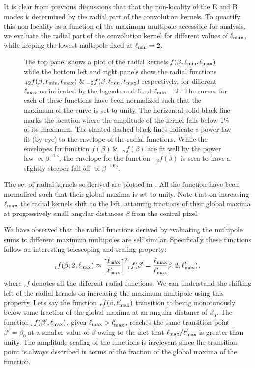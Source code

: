 It is clear from previous discussions that that the non-locality of the E and B modes is determined by the radial part of the convolution kernels. To quantify this non-locality as a function of the maximum multipole accessible for analysis, we evaluate the radial part of the convolution kernel for different values of $\ell_{\rm max}$, while keeping the lowest multipole fixed at $\ell_{\rm min}=2$. 
%
\begin{figure}[t]
\centering
{}
\caption{The top panel shows a plot of the radial kernels $f(\beta,\ell_{\rm min},\ell_{\rm max})$ while the bottom left and right panels show the radial functions ${}_{+2}f(\beta,\ell_{\rm min},\ell_{\rm max}) ~\&~ {}_{-2}f(\beta,\ell_{\rm min},\ell_{\rm max})$ respectively, for different $\ell_{\rm max}$ as indicated by the legends and fixed $\ell_{\rm min}=2$. The curves for each of these functions have been normalized such that the maximum of the curve is set to unity. The horizontal solid black line marks the location where the amplitude of the kernel falls below 1\% of its maximum. The slanted dashed black lines indicate a power law fit (by eye) to the envelope of the radial functions. While the envelopes for function $f(\beta)~\&~ {}_{-2}f(\beta)$ are fit well by the power law $\propto \beta^{-1.5}$, the envelope for the function ${}_{-2}f(\beta)$ is seen to have a slightly steeper fall off $\propto \beta^{-1.65}$.}
\label{fig:rad_ker_decay}
\end{figure}
%
The set of radial kernels so derived are plotted in . All the function have been normalized such that their global maxima is set to unity. Note that on increasing $\ell_{\rm max}$ the radial kernels shift to the left, attaining fractions of  their global maxima at progressively small angular distances $\beta$ from the central pixel.  

We have observed that the radial functions derived by evaluating the multipole sums to different maximum multipoles are self similar. Specifically these functions follow an interesting telescoping and scaling property: $${}_rf(\beta,2,\ell_{\rm max}) \approx \Big[\frac{\ell_{\rm max}}{\ell'_{\rm max}}\Big]^2{}_rf(\beta'=\frac{\ell_{\rm max}}{\ell'_{\rm max}} \beta ,2,\ell'_{\rm max}) \,,$$ where ${}_rf$ denotes all the different radial functions. We can understand the shifting left of the radial kernels on increasing the maximum multipole using this property. Lets say the function ${}_rf(\beta, \ell'_{\rm max})$ transition to being monotonously below some fraction of the global maxima at an angular distance of $\beta_0$.  The function ${}_rf(\beta', \ell_{\rm max})$, given $\ell_{\rm max} > \ell'_{\rm max}$, reaches the same transition point $\beta'=\beta_0$ at a smaller value of $\beta$ owing to the fact that $\ell_{\rm max}/\ell'_{\rm max}$ is greater than unity. The amplitude scaling of the functions is irrelevant since the transition point is always described in terms of the fraction of the global maxima of the function.

